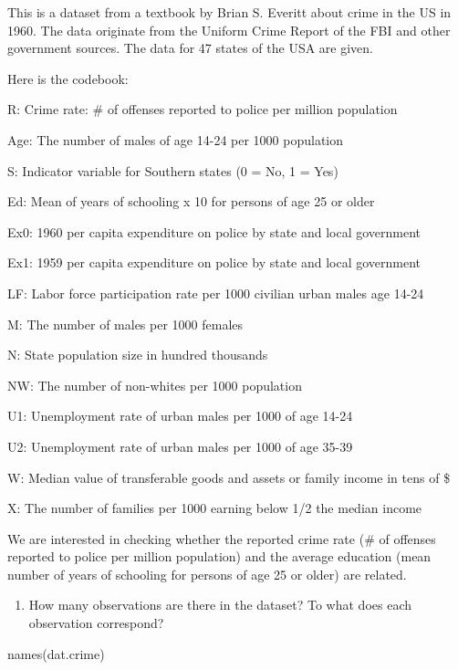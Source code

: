 \documentclass[
]{article}
\newenvironment{Shaded}{\begin{snugshade}}{\end{snugshade}}
\newcommand{\FunctionTok}[1]{\textcolor[rgb]{0.00,0.00,0.00}{#1}}
\newcommand{\NormalTok}[1]{#1}
\providecommand{\tightlist}{%
  \setlength{\itemsep}{0pt}\setlength{\parskip}{0pt}}
\begin{document}
This is a dataset from a textbook by Brian S. Everitt about crime in the
US in 1960. The data originate from the Uniform Crime Report of the FBI
and other government sources. The data for 47 states of the USA are
given.

Here is the codebook:

R: Crime rate: \# of offenses reported to police per million population

Age: The number of males of age 14-24 per 1000 population

S: Indicator variable for Southern states (0 = No, 1 = Yes)

Ed: Mean of years of schooling x 10 for persons of age 25 or older

Ex0: 1960 per capita expenditure on police by state and local government

Ex1: 1959 per capita expenditure on police by state and local government

LF: Labor force participation rate per 1000 civilian urban males age
14-24

M: The number of males per 1000 females

N: State population size in hundred thousands

NW: The number of non-whites per 1000 population

U1: Unemployment rate of urban males per 1000 of age 14-24

U2: Unemployment rate of urban males per 1000 of age 35-39

W: Median value of transferable goods and assets or family income in
tens of \$

X: The number of families per 1000 earning below 1/2 the median income

We are interested in checking whether the reported crime rate (\# of
offenses reported to police per million population) and the average
education (mean number of years of schooling for persons of age 25 or
older) are related.

\begin{enumerate}
\def\labelenumi{\arabic{enumi}.}
\tightlist
\item
  How many observations are there in the dataset? To what does each
  observation correspond?
\end{enumerate}

\begin{Shaded}
\begin{Highlighting}[]
\FunctionTok{names}\NormalTok{(dat.crime)}
\end{Highlighting}
\end{Shaded}
\end{document}
